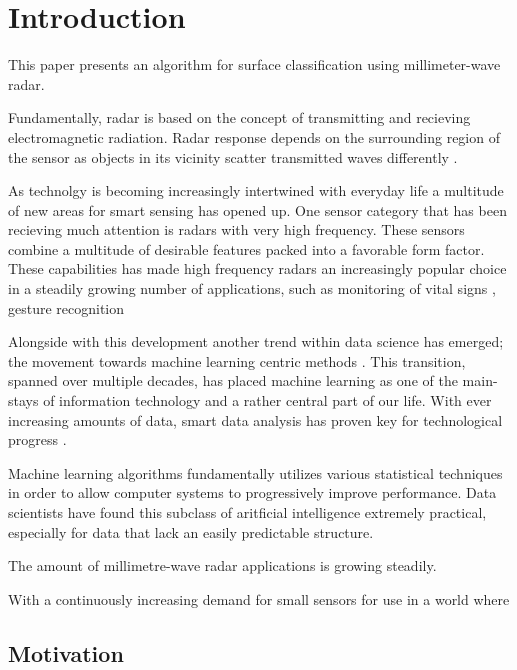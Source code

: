 \documentclass[a4paper, 12pt]{article}
\begin{document}
\section{Introduction}

This paper presents an algorithm for surface classification using millimeter-wave radar. 

Fundamentally, radar is based on the concept of transmitting and recieving electromagnetic radiation. Radar response depends on the surrounding region of the sensor as objects in its vicinity scatter transmitted waves differently \citep{richards_2014}.  

 As technolgy is becoming increasingly intertwined with everyday life a multitude of new areas for smart sensing has opened up. One sensor category that has been recieving much attention is radars with very high frequency. These sensors combine a multitude of desirable features packed into a favorable form factor. These capabilities has made high frequency radars an increasingly popular choice in a steadily growing number of applications, such as monitoring of vital signs \citep{kuo_lin_yu_lo_lyu_chou_chuang_2016}, gesture recognition \citep{lien_gillian_karagozler_amihood_schwesig_olson_raja_poupyrev_2016}

Alongside with this development another trend within data science has emerged; the movement towards machine learning centric methods . This transition, spanned over multiple decades, has placed machine learning as one of the main-stays of information technology and a rather central part of our life. With ever increasing amounts of data, smart data analysis has proven key for technological progress \citep{a_smola_svn_vishwanathan_2010}.

Machine learning algorithms fundamentally utilizes various statistical techniques in order to allow computer systems to progressively improve performance. Data scientists have found this subclass of aritficial intelligence extremely practical, especially for data that lack an easily predictable structure. 

The amount of millimetre-wave radar applications is growing steadily.

With a continuously increasing demand for small sensors for use in a world where 

\subsection{Motivation}
\end{document}

